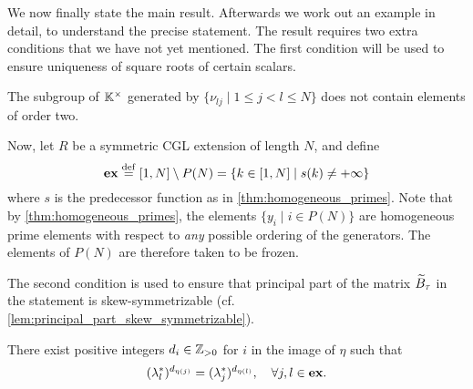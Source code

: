 We now finally state the main result. Afterwards we work out an example in detail, to
understand the precise statement. The result requires two extra conditions that we have
not yet mentioned. The first condition will be used to ensure uniqueness of square
roots of certain scalars.
\begin{condition}\label{cond:no_order_two}
	The subgroup of $\mathbb{K}^\times$ generated by $\{\nu_{lj} \mid 1 \leq j < l \leq N\}$ does not contain elements of order two.
\end{condition}
%
Now, let $R$ be a symmetric CGL extension of length $N$, and define
\begin{equation}\label{eq:ex}
	\mathbf{ex} \overset{\mathrm{def}}{=} [1 ,N] \setminus P(N) = \{k \in [1, N] \mid s(k) \neq +\infty\}
\end{equation}
%
where $s$ is the predecessor function as in \cref{thm:homogeneous_primes}. Note that by
\cref{thm:homogeneous_primes}, the elements $\{y_i \mid i \in P(N)\}$ are homogeneous
prime elements with respect to \emph{any} possible ordering of the generators. The
elements of $P(N)$ are therefore taken to be frozen.

The second condition is used to ensure that principal part of the matrix $\widetilde{B}_\tau$ in
the statement is skew-symmetrizable (cf. \cref{lem:principal_part_skew_symmetrizable}).
\begin{condition}\label{cond:lambda_star_to_the_d}
	There exist positive integers $d_i \in \mathbb{Z}_{>0}$ for $i$ in the image of $\eta$ such that
	\begin{equation*}
		(\lambda^*_l)^{d_{\eta(j)}} = (\lambda^*_j)^{d_{\eta(l)}}, \quad \forall j, l \in \mathbf{ex}.
	\end{equation*}
\end{condition}

